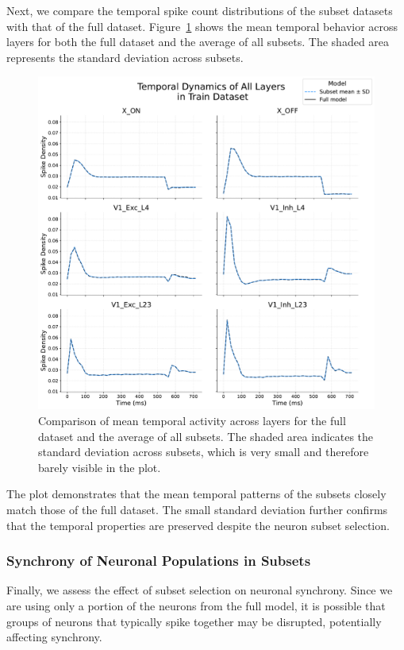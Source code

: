Next, we compare the temporal spike count distributions of the subset datasets with that of the full dataset. Figure~\ref{fig:temporal_distribution_subset_vs_full_train} shows the mean temporal behavior across layers for both the full dataset and the average of all subsets. The shaded area represents the standard deviation across subsets.
\begin{figure}
    \centering
    \includegraphics[width=\linewidth]{img/plots/temporal_distribution_subset_vs_full_train.pdf}
    \caption{Comparison of mean temporal activity across layers for the full dataset and the average of all subsets. The shaded area indicates the standard deviation across subsets, which is very small and therefore barely visible in the plot.}
    \label{fig:temporal_distribution_subset_vs_full_train}
\end{figure}

The plot demonstrates that the mean temporal patterns of the subsets closely match those of the full dataset. The small standard deviation further confirms that the temporal properties are preserved despite the neuron subset selection.


\subsubsection{Synchrony of Neuronal Populations in Subsets}
\label{subsubsec:neuron_synchrony_subset}
Finally, we assess the effect of subset selection on neuronal synchrony. Since we are using only a portion of the neurons from the full model, it is possible that groups of neurons that typically spike together may be disrupted, potentially affecting synchrony.


